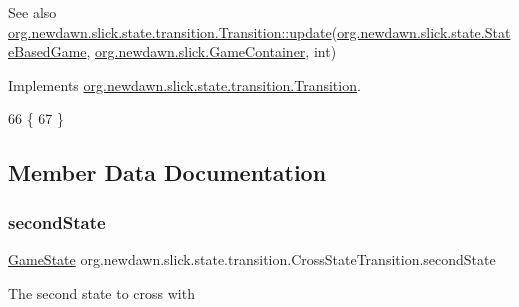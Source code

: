 \begin{DoxySeeAlso}{See also}
\mbox{\hyperlink{interfaceorg_1_1newdawn_1_1slick_1_1state_1_1transition_1_1_transition_a9be3072f6e2423e3d0a451a419d1d518}{org.\+newdawn.\+slick.\+state.\+transition.\+Transition\+::update}}(\mbox{\hyperlink{classorg_1_1newdawn_1_1slick_1_1state_1_1_state_based_game}{org.\+newdawn.\+slick.\+state.\+State\+Based\+Game}}, \mbox{\hyperlink{classorg_1_1newdawn_1_1slick_1_1_game_container}{org.\+newdawn.\+slick.\+Game\+Container}}, int) 
\end{DoxySeeAlso}


Implements \mbox{\hyperlink{interfaceorg_1_1newdawn_1_1slick_1_1state_1_1transition_1_1_transition_a9be3072f6e2423e3d0a451a419d1d518}{org.\+newdawn.\+slick.\+state.\+transition.\+Transition}}.


\begin{DoxyCode}
66                                                                                                       \{
67     \}
\end{DoxyCode}


\subsection{Member Data Documentation}
\mbox{\label{classorg_1_1newdawn_1_1slick_1_1state_1_1transition_1_1_cross_state_transition_a75dc8f5366c67cb40b833672578fd7e5}} 
\subsubsection{\texorpdfstring{second\+State}{secondState}}
{\footnotesize\ttfamily \mbox{\hyperlink{interfaceorg_1_1newdawn_1_1slick_1_1state_1_1_game_state}{Game\+State}} org.\+newdawn.\+slick.\+state.\+transition.\+Cross\+State\+Transition.\+second\+State\hspace{0.3cm}{\ttfamily [private]}}

The second state to cross with 